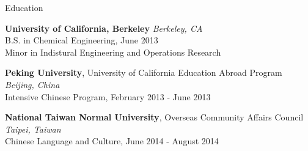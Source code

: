 \documentclass{resume} %
\begin{document}

\begin{rSection}{Education}

{\bf University of California, Berkeley} \hfill {\em Berkeley, CA} \\ 
B.S. in Chemical Engineering, June 2013 \\
Minor in Indistural Engineering and Operations Research \smallskip

{\bf Peking University}, University of California Education Abroad Program \hfill {\em Beijing, China} \\ 
Intensive Chinese Program, February 2013 - June 2013 \smallskip

{\bf National Taiwan Normal University}, Overseas Community Affairs Council \hfill {\em Taipei, Taiwan} \\ 
Chinese Language and Culture, June 2014 - August 2014 \smallskip \\

\end{rSection}









\end{document}

